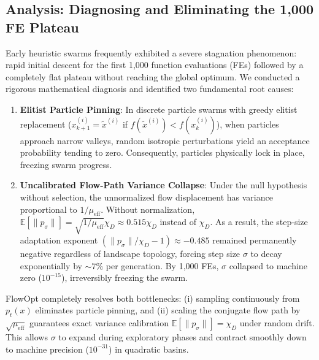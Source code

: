 \documentclass[10pt,journal,compsoc]{IEEEtran}
\begin{document}
\subsection{Analysis: Diagnosing and Eliminating the 1,000 FE Plateau}
Early heuristic swarms frequently exhibited a severe stagnation phenomenon: rapid initial descent for the first 1,000 function evaluations (FEs) followed by a completely flat plateau without reaching the global optimum. We conducted a rigorous mathematical diagnosis and identified two fundamental root causes:
\begin{enumerate}\setlength{\itemsep}{1pt}\setlength{\parskip}{0pt}
    \item \textbf{Elitist Particle Pinning}: In discrete particle swarms with greedy elitist replacement ($x_{k+1}^{(i)} = \tilde{x}^{(i)}$ if $f(\tilde{x}^{(i)}) < f(x_k^{(i)})$), when particles approach narrow valleys, random isotropic perturbations yield an acceptance probability tending to zero. Consequently, particles physically lock in place, freezing swarm progress.
    \item \textbf{Uncalibrated Flow-Path Variance Collapse}: Under the null hypothesis without selection, the unnormalized flow displacement has variance proportional to $1/\mu_{\text{eff}}$. Without normalization, $\mathbb{E}[\|p_\sigma\|] = \sqrt{1/\mu_{\text{eff}}} \chi_D \approx 0.515 \chi_D$ instead of $\chi_D$. As a result, the step-size adaptation exponent $(\|p_\sigma\|/\chi_D - 1) \approx -0.485$ remained permanently negative regardless of landscape topology, forcing step size $\sigma$ to decay exponentially by $\sim 7\%$ per generation. By 1,000 FEs, $\sigma$ collapsed to machine zero ($10^{-15}$), irreversibly freezing the swarm.
\end{enumerate}
FlowOpt completely resolves both bottlenecks: (i) sampling continuously from $p_t(x)$ eliminates particle pinning, and (ii) scaling the conjugate flow path by $\sqrt{\mu_{\text{eff}}}$ guarantees exact variance calibration $\mathbb{E}[\|p_\sigma\|] = \chi_D$ under random drift. This allows $\sigma$ to expand during exploratory phases and contract smoothly down to machine precision ($10^{-31}$) in quadratic basins.
\end{document}
